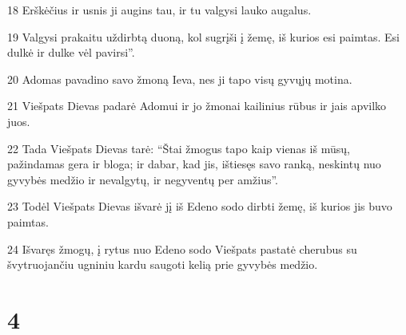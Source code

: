 \par 18 Erškėčius ir usnis ji augins tau, ir tu valgysi lauko augalus. 
\par 19 Valgysi prakaitu uždirbtą duoną, kol sugrįši į žemę, iš kurios esi paimtas. Esi dulkė ir dulke vėl pavirsi”. 
\par 20 Adomas pavadino savo žmoną Ieva, nes ji tapo visų gyvųjų motina. 
\par 21 Viešpats Dievas padarė Adomui ir jo žmonai kailinius rūbus ir jais apvilko juos. 
\par 22 Tada Viešpats Dievas tarė: “Štai žmogus tapo kaip vienas iš mūsų, pažindamas gera ir bloga; ir dabar, kad jis, ištiesęs savo ranką, neskintų nuo gyvybės medžio ir nevalgytų, ir negyventų per amžius”. 
\par 23 Todėl Viešpats Dievas išvarė jį iš Edeno sodo dirbti žemę, iš kurios jis buvo paimtas. 
\par 24 Išvaręs žmogų, į rytus nuo Edeno sodo Viešpats pastatė cherubus su švytruojančiu ugniniu kardu saugoti kelią prie gyvybės medžio.



\chapter{4}

